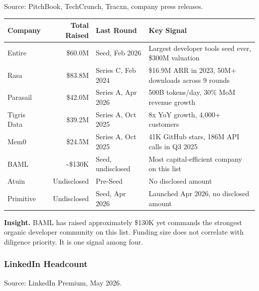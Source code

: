 \documentclass[11pt, letterpaper]{article}
\begin{document}
{\small\textcolor{midgray}{Source: PitchBook, TechCrunch, Tracxn, company press releases.}}

\vspace{0.4em}

\begin{table}[H]
\centering
\begin{tabularx}{\linewidth}{@{} l r l X @{}}
  \toprule
  \textbf{Company} & \textbf{Total Raised} & \textbf{Last Round} & \textbf{Key Signal} \\
  \midrule
  Entire      & \$60.0M               & Seed, Feb 2026     & Largest developer tools seed ever, \$300M valuation \\
  Rasa        & \$83.8M               & Series C, Feb 2024 & \$16.9M ARR in 2023, 50M+ downloads across 9 rounds \\
  Parasail    & \$42.0M               & Series A, Apr 2026 & 500B tokens/day, 30\% MoM revenue growth \\
  Tigris Data & \$39.2M               & Series A, Oct 2025 & 8x YoY growth, 4,000+ customers \\
  Mem0        & \$24.5M               & Series A, Oct 2025 & 41K GitHub stars, 186M API calls in Q3 2025 \\
  BAML        & \textasciitilde\$130K & Seed, undisclosed  & Most capital-efficient company on this list \\
  Atuin       & Undisclosed           & Pre-Seed           & No disclosed amount \\
  Primitive   & Undisclosed           & Seed, Apr 2026     & Launched Apr 2026, no disclosed amount \\
  \bottomrule
\end{tabularx}
\end{table}

\begin{callout}
  \textbf{Insight.} BAML has raised approximately \$130K yet commands the
  strongest organic developer community on this list. Funding size does not
  correlate with diligence priority. It is one signal among four.
\end{callout}

\subsubsection{LinkedIn Headcount}

{\small\textcolor{midgray}{Source: LinkedIn Premium, May 2026.}}

\vspace{0.4em}
\end{document}
